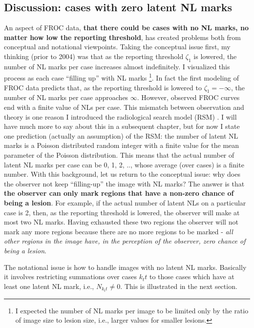 \documentclass[
]{book}
\begin{document}
\hypertarget{discussion-cases-with-zero-latent-nl-marks}{%
\subsection{Discussion: cases with zero latent NL marks}\label{discussion-cases-with-zero-latent-nl-marks}}

An aspect of FROC data, \textbf{that there could be cases with no NL marks, no matter how low the reporting threshold}, has created problems both from conceptual and notational viewpoints. Taking the conceptual issue first, my thinking (prior to 2004) was that as the reporting threshold \(\zeta_1\) is lowered, the number of NL marks per case increases almost indefinitely. I visualized this process as each case ``filling up'' with NL marks \footnote{I expected the number of NL marks per image to be limited only by the ratio of image size to lesion size, i.e., larger values for smaller lesions.}. In fact the first modeling of FROC data \citep{chakraborty1989maximum} predicts that, as the reporting threshold is lowered to \(\zeta_1 = -\infty\), the number of NL marks per case approaches \(\infty\). However, observed FROC curves end with a finite value of NLs per case. This mismatch between observation and theory is one reason I introduced the radiological search model (RSM) \citep{chakraborty2006search}. I will have much more to say about this in a subsequent chapter, but for now I state one prediction (actually an assumption) of the RSM: the number of latent NL marks is a Poisson distributed random integer with a finite value for the mean parameter of the Poisson distribution. This means that the actual number of latent NL marks per case can be 0, 1, 2, .., whose average (over cases) is a finite number. With this background, let us return to the conceptual issue: why does the observer not keep ``filling-up'' the image with NL marks? The answer is that \textbf{the observer can only mark regions that have a non-zero chance of being a lesion}. For example, if the actual number of latent NLs on a particular case is 2, then, as the reporting threshold is lowered, the observer will make at most two NL marks. Having exhausted these two regions the observer will not mark any more regions because there are no more regions to be marked - \emph{all other regions in the image have, in the perception of the observer, zero chance of being a lesion}.

The notational issue is how to handle images with no latent NL marks. Basically it involves restricting summations over cases \(k_ t t\) to those cases which have at least one latent NL mark, i.e., \(N_{k_t t} \neq 0\). This is illustrated in the next section.
\end{document}
